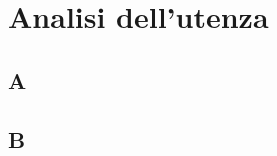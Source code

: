 \documentclass[../relazione.tex]{subfiles}
\begin{document}
\section{Analisi dell'utenza}
	\subsection{A}
	\subsection{B}
\end{document}
